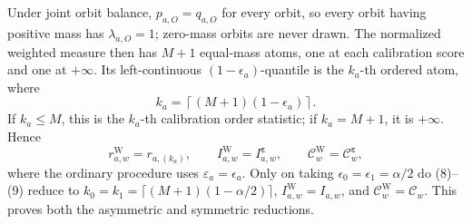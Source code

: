 Under joint orbit balance, \(p_{a,O}=q_{a,O}\) for every orbit, so every orbit having positive mass has \(\lambda_{a,O}=1\); zero-mass orbits are never drawn. The normalized weighted measure then has \(M+1\) equal-mass atoms, one at each calibration score and one at \(+\infty\). Its left-continuous \((1-\epsilon_a)\)-quantile is the \(k_a\)-th ordered atom, where
\[
k_a=\left\lceil(M+1)(1-\epsilon_a)\right\rceil.
\tag{8}
\]
If \(k_a\le M\), this is the \(k_a\)-th calibration order statistic; if \(k_a=M+1\), it is \(+\infty\). Hence
\[
r^{\mathrm W}_{a,w}=r_{a,(k_a)},\qquad I^{\mathrm W}_{a,w}=I^{\boldsymbol\varepsilon}_{a,w},\qquad\mathcal C^{\mathrm W}_w=\mathcal C^{\boldsymbol\varepsilon}_w,
\tag{9}
\]
where the ordinary procedure uses \(\varepsilon_a=\epsilon_a\). Only on taking \(\epsilon_0=\epsilon_1=\alpha/2\) do (8)--(9) reduce to \(k_0=k_1=\lceil(M+1)(1-\alpha/2)\rceil\), \(I^{\mathrm W}_{a,w}=I_{a,w}\), and \(\mathcal C^{\mathrm W}_w=\mathcal C_w\). This proves both the asymmetric and symmetric reductions.